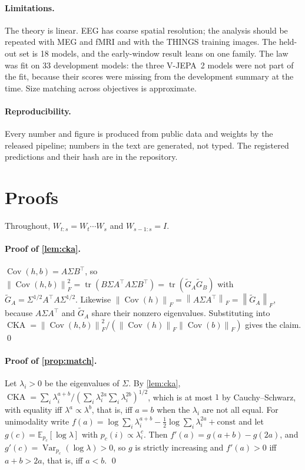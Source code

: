 \documentclass[10pt]{article}
\theoremstyle{plain}
\theoremstyle{definition}
\theoremstyle{remark}
\newcommand{\E}{\mathbb{E}}
\newcommand{\T}{\top}
\newcommand{\fro}[1]{\left\lVert #1 \right\rVert_F}
\newcommand{\CKA}{\operatorname{CKA}}
\newcommand{\Cov}{\operatorname{Cov}}
\newcommand{\vNdev}{33}\newcommand{\vNheld}{18}\newcommand{\vNall}{51}
\begin{document}
\paragraph{Limitations.} The theory is linear. EEG has coarse spatial resolution; the analysis
should be repeated with MEG and fMRI and with the THINGS training images. The held-out set is
\vNheld{} models, and the early-window result leans on one family. The law was fit on \vNdev{}
development models: the three V-JEPA~2 models were not part of the fit, because their scores were
missing from the development summary at the time. Size matching across objectives is approximate.

\paragraph{Reproducibility.} Every number and figure is produced from public data and weights by
the released pipeline; numbers in the text are generated, not typed. The registered predictions and
their hash are in the repository.

{\small


}

\clearpage
\appendix
\section{Proofs}
\label{app:proofs}

Throughout, $W_{t:s} = W_t\cdots W_s$ and $W_{s-1:s} = I$.

\paragraph{Proof of \cref{lem:cka}.} $\Cov(h,b) = A\Sigma B^\T$, so
$\fro{\Cov(h,b)}^2 = \operatorname{tr}(B\Sigma A^\T A\Sigma B^\T)
= \operatorname{tr}(\tilde G_A\tilde G_B)$ with $\tilde G_A = \Sigma^{1/2}A^\T A\Sigma^{1/2}$.
Likewise $\fro{\Cov(h)} = \fro{A\Sigma A^\T} = \fro{\tilde G_A}$, because $A\Sigma A^\T$ and
$\tilde G_A$ share their nonzero eigenvalues. Substituting into
$\CKA = \fro{\Cov(h,b)}^2/(\fro{\Cov(h)}\fro{\Cov(b)})$ gives the claim. \qed

\paragraph{Proof of \cref{prop:match}.} Let $\lambda_i>0$ be the eigenvalues of $\Sigma$. By
\cref{lem:cka}, $\CKA = \sum_i \lambda_i^{a+b} / (\sum_i\lambda_i^{2a}\sum_i\lambda_i^{2b})^{1/2}$,
which is at most $1$ by Cauchy--Schwarz, with equality iff $\lambda^a\propto\lambda^b$, that is,
iff $a=b$ when the $\lambda_i$ are not all equal. For unimodality write
$f(a) = \log\sum_i\lambda_i^{a+b} - \tfrac12\log\sum_i\lambda_i^{2a} + \text{const}$ and let
$g(c) = \E_{p_c}[\log\lambda]$ with $p_c(i)\propto\lambda_i^c$. Then
$f'(a) = g(a+b) - g(2a)$, and $g'(c) = \operatorname{Var}_{p_c}(\log\lambda) > 0$, so $g$ is
strictly increasing and $f'(a)>0$ iff $a+b>2a$, that is, iff $a<b$. \qed
\end{document}
